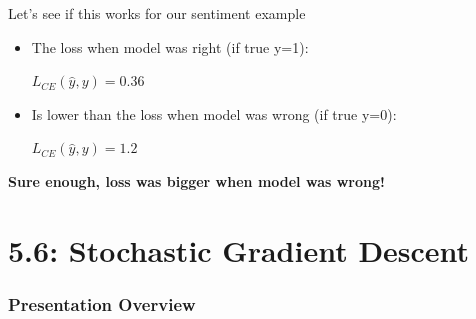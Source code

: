 \documentclass[13.5pt,aspecratio=169]{beamer}
\begin{document}
\begin{frame}{Let’s see if this works for our sentiment example}
    \begin{block}{}
         \begin{itemize}
           \item  The loss when model was right (if true y=1):
           \centerline{$L_{CE}(\hat{y},y) = 0.36$}
           \item Is lower than the loss when model was wrong (if true y=0):
            \centerline{$L_{CE} (\hat{y},y) = 1.2$}
        \end{itemize}
    \end{block}
    \Large \textbf{Sure enough, loss was bigger when model was wrong!
}
\end{frame}

\section{5.6: Stochastic Gradient Descent} %
\begin{frame}
	\frametitle{Presentation Overview} %
	\tableofcontents[currentsection, subsectionstyle=hide]
\end{frame}

\end{document}
